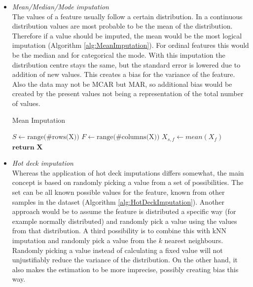 \documentclass[10pt,a4paper]{article}
\begin{document}
\begin{itemize}
		\item \textit{Mean/Median/Mode imputation} \\
		The values of a feature usually follow a certain distribution. In a continuous distribution values are most probable to be the mean of the distribution. Therefore if a value should be imputed, the mean would be the most logical imputation (Algorithm \ref{alg:MeanImputation}). For ordinal features this would be the median and for categorical the mode\cite{haukoos2007advanced, myrtveit2001analyzing, cartwright2003dealing}. With this imputation the distribution centre stays the same, but the standard error is lowered due to addition of new values. This creates a bias for the variance of the feature. Also the data may not be MCAR but MAR, so additional bias would be created by the present values not being a representation of the total number of values\cite{donders2006gentle, pedersen2017missing}.
		
		\begin{algorithm}[H]
			\caption{Mean Imputation}\label{alg:MeanImputation}
			\begin{algorithmic}[1]
				\State $S \gets \text{range(\#rows(X))}$ 	
				\State $F \gets \text{range(\#columns(X))}$ 	
				 					
				 				 			
				\State $X_{s,f} \gets \textit{mean}(X_f)$	
				\EndIf
				\EndFor
				\State $\textbf{return X}$
				\EndProcedure
			\end{algorithmic}
		\end{algorithm}	
		
		\item \textit{Hot deck imputation} \\
		Whereas the application of hot deck imputations differs somewhat\cite{myrtveit2001analyzing, cartwright2003dealing, haukoos2007advanced}, the main concept is based on randomly picking a value from a set of possibilities. The set can be all known possible values for the feature, known from other samples in the dataset (Algorithm \ref{alg:HotDeckImputation}). Another approach would be to assume the feature is distributed a specific way (for example normally distributed) and randomly pick a value using the values from that distribution. A third possibility is to combine this with kNN imputation and randomly pick a value from the $k$ nearest neighbours. Randomly picking a value instead of calculating a fixed value will not unjustifiably reduce the variance of the distribution. On the other hand, it also makes the estimation to be more imprecise, possibly creating bias this way\cite{haukoos2007advanced}.
		

\end{itemize}
\end{document}
